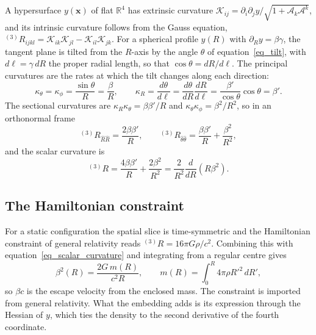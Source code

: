 \documentclass[pdflatex,sn-mathphys-num]{sn-jnl}%
\theoremstyle{thmstyleone}%
\theoremstyle{thmstyletwo}%
\theoremstyle{thmstylethree}%
\begin{document}
A hypersurface $y(\mathbf{x})$ of flat $\mathbb{R}^4$ has extrinsic curvature $\mathcal{K}_{ij}=\partial_i\partial_jy/\sqrt{1+\mathcal{A}_k\mathcal{A}^k}$, and its intrinsic curvature follows from the Gauss equation, ${}^{(3)}\!R_{ijkl}=\mathcal{K}_{ik}\mathcal{K}_{jl}-\mathcal{K}_{il}\mathcal{K}_{jk}$. For a spherical profile $y(R)$ with $\partial_Ry=\beta\gamma$, the tangent plane is tilted from the $R$-axis by the angle $\theta$ of equation~\eqref{eq_tilt}, with $d\ell=\gamma\,dR$ the proper radial length, so that $\cos\theta=dR/d\ell$. The principal curvatures are the rates at which the tilt changes along each direction:
\begin{equation}\label{eq_principal_curvatures}
    \kappa_\theta=\kappa_\phi=\frac{\sin\theta}{R}=\frac\beta R,
    \qquad
    \kappa_R=\frac{d\theta}{d\ell}=\frac{d\theta}{dR}\frac{dR}{d\ell}=\frac{\beta'}{\cos\theta}\cos\theta=\beta' .
\end{equation}
The sectional curvatures are $\kappa_R\kappa_\theta=\beta\beta'/R$ and $\kappa_\theta\kappa_\phi=\beta^2/R^2$, so in an orthonormal frame
\begin{equation}\label{eq_ricci_components}
    {}^{(3)}\!R_{\hat R\hat R}=\frac{2\beta\beta'}{R},
    \qquad
    {}^{(3)}\!R_{\hat\theta\hat\theta}=\frac{\beta\beta'}{R}+\frac{\beta^2}{R^2},
\end{equation}
and the scalar curvature is
\begin{equation}\label{eq_scalar_curvature}
    {}^{(3)}\!R=\frac{4\beta\beta'}{R}+\frac{2\beta^2}{R^2}=\frac{2}{R^2}\frac{d}{dR}\left(R\beta^2\right).
\end{equation}

\subsection{The Hamiltonian constraint}

For a static configuration the spatial slice is time-symmetric and the Hamiltonian constraint of general relativity reads ${}^{(3)}\!R=16\pi G\rho/c^2$. Combining this with equation~\eqref{eq_scalar_curvature} and integrating from a regular centre gives
\begin{equation}\label{eq_beta_enclosed}
    \beta^2(R)=\frac{2G\,m(R)}{c^2R},
    \qquad
    m(R)=\int_0^R4\pi\rho R'^2\,dR' ,
\end{equation}
so $\beta c$ is the escape velocity from the enclosed mass. The constraint is imported from general relativity. What the embedding adds is its expression through the Hessian of $y$, which ties the density to the second derivative of the fourth coordinate.
\end{document}
